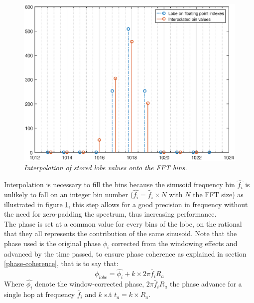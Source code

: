 \documentclass[]{article}
\begin{document}
\begin{figure}
	\centering
	\includegraphics[scale=0.4]{Interpolation.eps}
	\caption{\it Interpolation of stored lobe values onto the FFT bins.}
	\label{interpBin}
\end{figure}
Interpolation is necessary to fill the bins because the sinusoid frequency bin $\hat{f_i}$ is unlikely to fall on an integer bin number ($\hat{f_i} = \tilde{f_i}\times N$ with $N$ the FFT size) as illustrated in figure \ref{interpBin}, this step allows for a good precision in frequency without the need for zero-padding the spectrum, thus increasing performance.\\
The phase is set at a common value for every bins of the lobe, on the rational that they all represents the contribution of the same sinusoid. Note that the phase used is the original phase $\phi_{i}$ corrected from the windowing effects and advanced by the time passed, to ensure phase coherence as explained in section \ref{phase-coherence}, that is to say that:
\begin{equation}\label{statPhaseShift}
\phi_{lobe} = \hat{\phi_{i}} + k\times 2\pi \tilde{f_i} R_a
\end{equation}
Where $\hat{\phi_{i}}$ denote the window-corrected phase, $2\pi \tilde{f_i} R_a$ the phase advance for a single hop at frequency $\tilde{f_i}$ and $k$ s.t $t_a = k\times R_a$.
\end{document}
